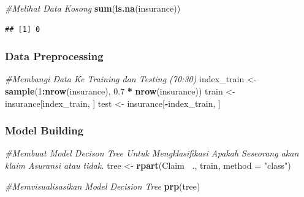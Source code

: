 \documentclass[]{article}
\newenvironment{Shaded}{\begin{snugshade}}{\end{snugshade}}
\newcommand{\CommentTok}[1]{\textcolor[rgb]{0.56,0.35,0.01}{\textit{#1}}}
\newcommand{\DataTypeTok}[1]{\textcolor[rgb]{0.13,0.29,0.53}{#1}}
\newcommand{\DecValTok}[1]{\textcolor[rgb]{0.00,0.00,0.81}{#1}}
\newcommand{\FloatTok}[1]{\textcolor[rgb]{0.00,0.00,0.81}{#1}}
\newcommand{\KeywordTok}[1]{\textcolor[rgb]{0.13,0.29,0.53}{\textbf{#1}}}
\newcommand{\NormalTok}[1]{#1}
\newcommand{\OperatorTok}[1]{\textcolor[rgb]{0.81,0.36,0.00}{\textbf{#1}}}
\newcommand{\StringTok}[1]{\textcolor[rgb]{0.31,0.60,0.02}{#1}}
\begin{document}
\begin{Shaded}
\begin{Highlighting}[]
\CommentTok{#Melihat Data Kosong}
\KeywordTok{sum}\NormalTok{(}\KeywordTok{is.na}\NormalTok{(insurance))}
\end{Highlighting}
\end{Shaded}

\begin{verbatim}
## [1] 0
\end{verbatim}

\hypertarget{data-preprocessing}{%
\subsubsection{Data Preprocessing}\label{data-preprocessing}}

\begin{Shaded}
\begin{Highlighting}[]
\CommentTok{#Membangi Data Ke Training dan Testing (70:30)}
\NormalTok{index_train <-}\StringTok{ }\KeywordTok{sample}\NormalTok{(}\DecValTok{1}\OperatorTok{:}\KeywordTok{nrow}\NormalTok{(insurance), }\FloatTok{0.7} \OperatorTok{*}\StringTok{ }\KeywordTok{nrow}\NormalTok{(insurance))}
\NormalTok{train <-}\StringTok{ }\NormalTok{insurance[index_train, ]}
\NormalTok{test <-}\StringTok{ }\NormalTok{insurance[}\OperatorTok{-}\NormalTok{index_train, ]}
\end{Highlighting}
\end{Shaded}

\hypertarget{model-building}{%
\subsubsection{Model Building}\label{model-building}}

\begin{Shaded}
\begin{Highlighting}[]
\CommentTok{#Membuat Model Decison Tree Untuk Mengklasifikasi Apakah Seseorang akan klaim Asuransi atau tidak. }
\NormalTok{tree <-}\StringTok{ }\KeywordTok{rpart}\NormalTok{(Claim }\OperatorTok{~}\NormalTok{., train, }\DataTypeTok{method =} \StringTok{"class"}\NormalTok{)}
\end{Highlighting}
\end{Shaded}

\begin{Shaded}
\begin{Highlighting}[]
\CommentTok{#Memvisualisasikan Model Decision Tree}
\KeywordTok{prp}\NormalTok{(tree)}
\end{Highlighting}
\end{Shaded}
\end{document}
